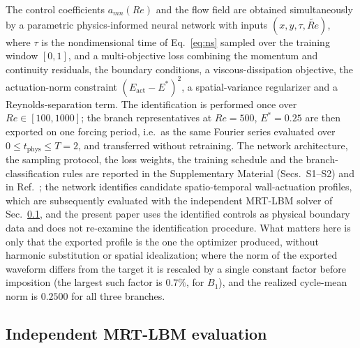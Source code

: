 \documentclass[11pt,a4paper]{article}
\newcommand{\Eact}{E_{\mathrm{act}}}
\newenvironment{chgadd}{\par\color{blue}}{\par\color{black}}
\begin{document}
\begin{chgadd}
The control coefficients $a_{mn}(Re)$ and the flow field are obtained simultaneously
by a parametric physics-informed neural network \cite{raissi2019pinn,cai2021pinnreview}
with inputs $(x,y,\tau,\widetilde{Re})$, where
$\tau$ is the nondimensional time of Eq.~\eqref{eq:ns} sampled over the training
window $[0,1]$,
and a multi-objective loss combining the momentum and continuity residuals, the
boundary conditions, a viscous-dissipation objective, the actuation-norm
constraint $(\Eact-E^\ast)^2$, a spatial-variance regularizer and a
Reynolds-separation term. The identification is performed once over
$Re\in[100,1000]$; the branch representatives at $Re=500$, $E^\ast=0.25$ are then
exported on one forcing period, i.e.\ as the same Fourier series evaluated over
$0\le t_{\mathrm{phys}}\le T=2$, and transferred without retraining. The network
architecture, the sampling protocol, the loss weights, the training schedule and
the branch-classification rules are reported in the Supplementary Material
(Secs.~S1--S2) and in Ref.~\cite{beniaiche2026}; the network identifies candidate
spatio-temporal wall-actuation profiles, which are subsequently evaluated with the
independent MRT-LBM solver of Sec.~\ref{sec:lbm}, and the present paper uses the
identified controls as physical boundary data and does not re-examine the
identification procedure. What matters here is only that the exported profile is
the one the optimizer produced, without harmonic substitution or spatial
idealization; where the norm of the exported waveform differs from the target it
is rescaled by a single constant factor before imposition (the largest such
factor is $0.7\%$, for $B_1$), and the realized cycle-mean norm is $0.2500$ for
all three branches.

\subsection{Independent MRT-LBM evaluation}
\label{sec:lbm}


\end{chgadd}
\end{document}
